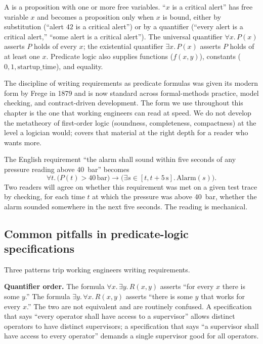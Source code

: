 A  is a proposition with one or more free variables. ``$x$ is a critical alert'' has free variable $x$ and becomes a proposition only when $x$ is bound, either by substitution (``alert $42$ is a critical alert'') or by a quantifier (``every alert is a critical alert,'' ``some alert is a critical alert''). The universal quantifier $\forall x.\, P(x)$ asserts $P$ holds of every $x$; the existential quantifier $\exists x.\, P(x)$ asserts $P$ holds of at least one $x$. Predicate logic also supplies functions ($f(x, y)$), constants ($0, 1, \mathrm{startup\_time}$), and equality.

The discipline of writing requirements as predicate formulas was given its modern form by Frege in 1879 \cite{hist:frege1879} and is now standard across formal-methods practice, model checking, and contract-driven development. The form we use throughout this chapter is the one that working engineers can read at speed. We do not develop the metatheory of first-order logic (soundness, completeness, compactness) at the level a logician would; \cite{text:sipser} covers that material at the right depth for a reader who wants more.

\begin{example}
The English requirement ``the alarm shall sound within five seconds of any pressure reading above \SI{40}{\bar}'' becomes
\[
\forall t.\, \big( P(t) > 40 \,\text{bar} \big) \to \big( \exists s \in [t, t + 5\,\text{s}].\, \mathrm{Alarm}(s) \big).
\]
Two readers will agree on whether this requirement was met on a given test trace by checking, for each time $t$ at which the pressure was above \SI{40}{\bar}, whether the alarm sounded somewhere in the next five seconds. The reading is mechanical.
\end{example}

\subsection{Common pitfalls in predicate-logic specifications}

Three patterns trip working engineers writing requirements.

\textbf{Quantifier order.} The formula $\forall x.\, \exists y.\, R(x, y)$ asserts ``for every $x$ there is some $y$.'' The formula $\exists y.\, \forall x.\, R(x, y)$ asserts ``there is some $y$ that works for every $x$.'' The two are not equivalent and are routinely confused. A specification that says ``every operator shall have access to a supervisor'' allows distinct operators to have distinct supervisors; a specification that says ``a supervisor shall have access to every operator'' demands a single supervisor good for all operators.


